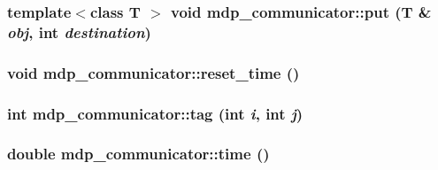 \label{classmdp__communicator_ae684429614dd4d06cead7fb9ea241ff0}
\hypertarget{classmdp__communicator_a2508725493731958b8f1f29509055d4f}{
\subsubsection[{put}]{\setlength{\rightskip}{0pt plus 5cm}template$<$class T $>$ void mdp\_\-communicator::put (T \& {\em obj}, \/  int {\em destination})}}
\label{classmdp__communicator_a2508725493731958b8f1f29509055d4f}
\hypertarget{classmdp__communicator_a46086387c07ac505f7658718b52c073e}{
\subsubsection[{reset\_\-time}]{\setlength{\rightskip}{0pt plus 5cm}void mdp\_\-communicator::reset\_\-time ()}}
\label{classmdp__communicator_a46086387c07ac505f7658718b52c073e}
\hypertarget{classmdp__communicator_a927db59c7ab066becc693d3b944d7dfa}{
\subsubsection[{tag}]{\setlength{\rightskip}{0pt plus 5cm}int mdp\_\-communicator::tag (int {\em i}, \/  int {\em j})}}
\label{classmdp__communicator_a927db59c7ab066becc693d3b944d7dfa}
\hypertarget{classmdp__communicator_a7e725836b00c3485cd02b3ad001cf6dd}{
\subsubsection[{time}]{\setlength{\rightskip}{0pt plus 5cm}double mdp\_\-communicator::time ()}}
\label{classmdp__communicator_a7e725836b00c3485cd02b3ad001cf6dd}


